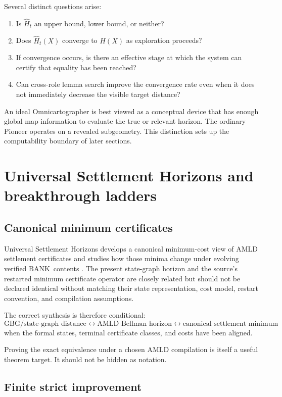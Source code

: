 \documentclass[11pt]{article}
\theoremstyle{remark}
\newcommand{\BANK}{\ensuremath{\mathrm{BANK}}}
\begin{document}
Several distinct questions arise:
\begin{enumerate}
\item Is $\widehat H_t$ an upper bound, lower bound, or neither?
\item Does $\widehat H_t(X)$ converge to $H(X)$ as exploration proceeds?
\item If convergence occurs, is there an effective stage at which the system can certify that equality has been reached?
\item Can cross-role lemma search improve the convergence rate even when it does not immediately decrease the visible target distance?
\end{enumerate}

An ideal Omnicartographer is best viewed as a conceptual device that has enough global map information to evaluate the true or relevant horizon. The ordinary Pioneer operates on a revealed subgeometry. This distinction sets up the computability boundary of later sections.

\section{Universal Settlement Horizons and breakthrough ladders}

\subsection{Canonical minimum certificates}

Universal Settlement Horizons develops a canonical minimum-cost view of AMLD settlement certificates and studies how those minima change under evolving verified \BANK\ contents \cite{TennesonUSH}. The present state-graph horizon and the source's restarted minimum certificate operator are closely related but should not be declared identical without matching their state representation, cost model, restart convention, and compilation assumptions.

The correct synthesis is therefore conditional:
\[
\boxed{
\text{GBG/state-graph distance}
\longleftrightarrow
\text{AMLD Bellman horizon}
\longleftrightarrow
\text{canonical settlement minimum}
}
\]
when the formal states, terminal certificate classes, and costs have been aligned.

Proving the exact equivalence under a chosen AMLD compilation is itself a useful theorem target. It should not be hidden as notation.

\subsection{Finite strict improvement}
\end{document}
